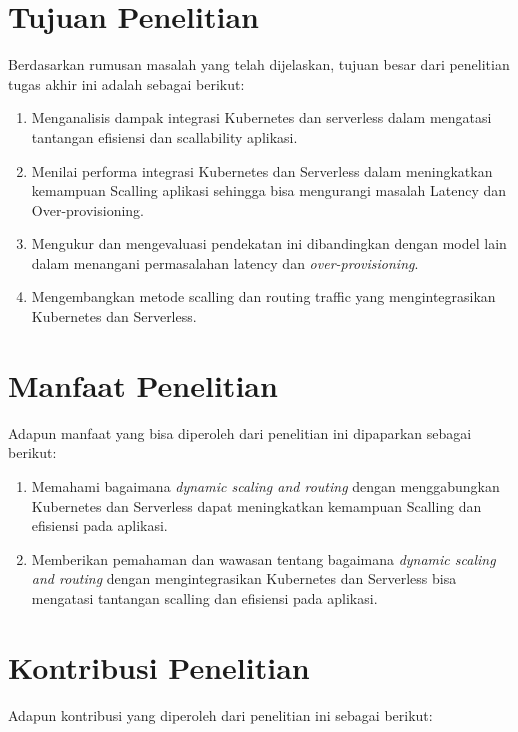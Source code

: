 \section{Tujuan Penelitian}
\label{sec:tujuan-penelitian}

Berdasarkan rumusan masalah yang telah dijelaskan, tujuan besar dari penelitian tugas akhir ini adalah sebagai berikut:

\begin{enumerate}
    \item Menganalisis dampak integrasi Kubernetes dan serverless dalam mengatasi tantangan efisiensi dan scallability aplikasi.
    \item Menilai performa integrasi Kubernetes dan Serverless dalam meningkatkan kemampuan Scalling aplikasi sehingga bisa mengurangi masalah Latency dan Over-provisioning.
    \item Mengukur dan mengevaluasi pendekatan ini dibandingkan dengan model lain dalam menangani permasalahan latency dan \emph{over-provisioning}.
    \item Mengembangkan metode scalling dan routing traffic yang mengintegrasikan Kubernetes dan Serverless.
\end{enumerate}

\section{Manfaat Penelitian}
\label{sec:manfaat-penelitian}

Adapun manfaat yang bisa diperoleh dari penelitian ini dipaparkan sebagai berikut:

\begin{enumerate}
    \item Memahami bagaimana \emph{dynamic scaling and routing} dengan menggabungkan Kubernetes dan Serverless dapat meningkatkan kemampuan Scalling dan efisiensi pada aplikasi.
    \item Memberikan pemahaman dan wawasan tentang bagaimana \emph{dynamic scaling and routing} dengan mengintegrasikan Kubernetes dan Serverless bisa mengatasi tantangan scalling dan efisiensi pada aplikasi.
\end{enumerate}

\section{Kontribusi Penelitian}
\label{sec:kontribusi-penelitian}

Adapun kontribusi yang diperoleh dari penelitian ini sebagai berikut:


